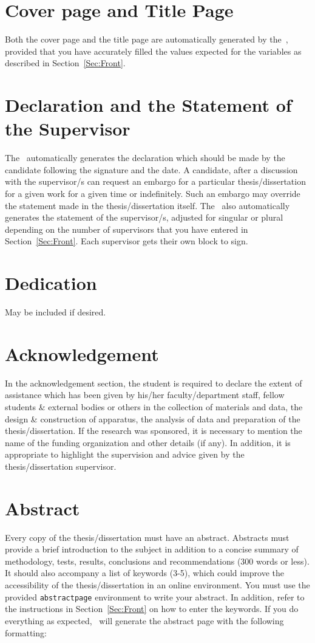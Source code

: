 \documentclass[12pt]{uomthesis}
\begin{document}
\section{Cover page and Title Page}
Both the cover page and the title page are automatically generated by the~\TheClass, provided that you have accurately filled the values expected for the variables as described in Section~\ref{Sec:Front}.



\section{Declaration and the Statement of the Supervisor}
The~\TheClass{} automatically generates the declaration which should be made by the candidate following the signature and the date.  A candidate, after a discussion with the supervisor/s can request an embargo for a particular thesis/dissertation for a given work for a given time or indefinitely. Such an embargo may override the statement made in the thesis/dissertation itself.
%
The~\TheClass{} also automatically generates the statement of the supervisor/s, adjusted for singular or plural depending on the number of supervisors that you have entered in Section~\ref{Sec:Front}. Each supervisor gets their own block to sign. 


\section{Dedication}
May be included if desired.

\section{Acknowledgement}
In the acknowledgement section, the student is required to declare the extent of assistance which has been given by his/her faculty/department staff, fellow students \& external bodies or others in the collection of materials and data, the design \& construction of apparatus, the analysis of data and preparation of the thesis/dissertation. If the research was sponsored, it is necessary to mention the name of the funding organization and other details (if any). In addition, it is appropriate to highlight the supervision and advice given by the thesis/dissertation supervisor.

\section{Abstract}
Every copy of the thesis/dissertation must have an abstract. Abstracts must provide a brief introduction to the subject in addition to a concise summary of methodology, tests, results, conclusions and recommendations (300 words or less). It should also accompany a list of keywords (3-5), which could improve the accessibility of the thesis/dissertation in an online environment. You must use the provided \verb|abstractpage| environment to write your abstract. In addition, refer to the instructions in Section~\ref{Sec:Front} on how to enter the keywords. If you do everything as expected,~\TheClass{} will generate the abstract page with the following formatting:
\end{document}
